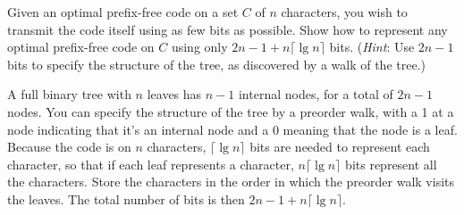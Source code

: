 \item[\textbf{Exercise 15.3-5}]
Given an optimal prefix-free code on a set $C$ of $n$ characters, you wish to
transmit the code itself using as few bits as possible. Show how to represent
any optimal prefix-free code on $C$ using only $2n - 1 + n \lceil \lg n \rceil$
bits. (\textit{Hint}: Use $2n - 1$ bits to specify the structure of the tree, as
discovered by a walk of the tree.)

\Solution

A full binary tree with $n$ leaves has $n - 1$ internal nodes, for a total of
$2n - 1$ nodes. You can specify the structure of the tree by a preorder walk,
with a 1 at a node indicating that it's an internal node and a 0 meaning that
the node is a leaf. Because the code is on $n$ characters, $\lceil \lg n \rceil$
bits are needed to represent each character, so that if each leaf represents a
character, $n \lceil \lg n \rceil$ bits represent all the characters. Store the
characters in the order in which the preorder walk visits the leaves. The total
number of bits is then $2n - 1 + n \lceil \lg n \rceil$.
